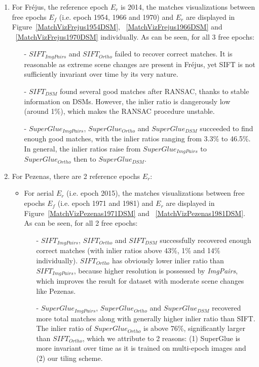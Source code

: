 \begin{enumerate}
	\item For Fr{\'e}jus, the reference epoch $E_r$ is 2014, the matches visualizations between free epochs $E_f$ (i.e. epoch 1954, 1966 and 1970) and $E_r$ are displayed in Figure~\ref{MatchVizFrejus1954DSM}, ~\ref{MatchVizFrejus1966DSM} and ~\ref{MatchVizFrejus1970DSM} individually. As can be seen, for all 3 free epochs:\\
	\begin{itemize}
		\item[-] $SIFT_{ImgPairs}$ and $SIFT_{Ortho}$ failed to recover correct matches. It is reasonable as extreme scene changes are present in Fr{\'e}jus, yet SIFT is not sufficiently invariant over time by its very nature.
		\item[-] $SIFT_{DSM}$ found several good matches after RANSAC, thanks to stable information on DSMs. However, the inlier ratio is dangerously low (around 1\%), which makes the RANSAC procedure unstable.
		\item[-] $SuperGlue_{ImgPairs}$, $SuperGlue_{Ortho}$ and $SuperGlue_{DSM}$ succeeded to find enough good matches, with the inlier ratios ranging from 3.3\% to 46.5\%. In general, the inlier ratios raise from $SuperGlue_{ImgPairs}$ to $SuperGlue_{Ortho}$ then to $SuperGlue_{DSM}$.
	\end{itemize}
	\item For Pezenas, there are 2 reference epochs $E_r$:\\
	\begin{itemize}
	\item For aerial $E_r$ (i.e. epoch 2015), the matches visualizations between free epochs $E_f$ (i.e. epoch 1971 and 1981) and $E_r$ are displayed in Figure~\ref{MatchVizPezenas1971DSM} and ~\ref{MatchVizPezenas1981DSM}. As can be seen, for all 2 free epochs:\\
		\begin{itemize}
			\item[-] $SIFT_{ImgPairs}$, $SIFT_{Ortho}$ and $SIFT_{DSM}$ successfully recovered enough correct matches (with inlier ratios above 43\%, 1\% and 14\% individually). $SIFT_{Ortho}$ has obviously lower inlier ratio than $SIFT_{ImgPairs}$, because higher resolution is possessed by \textit{ImgPairs}, which improves the result for dataset with moderate scene changes like Pezenas.
			\item[-] $SuperGlue_{ImgPairs}$, $SuperGlue_{Ortho}$ and $SuperGlue_{DSM}$ recovered more total matches along with generally higher inlier ratio than SIFT. The inlier ratio of $SuperGlue_{Ortho}$ is above 76\%, significantly larger than $SIFT_{Ortho}$, which we attribute to 2 reasons: (1) SuperGlue is more invariant over time as it is trained on multi-epoch images and (2) our tiling scheme. 

\end{itemize}
\end{itemize}
\end{enumerate}
